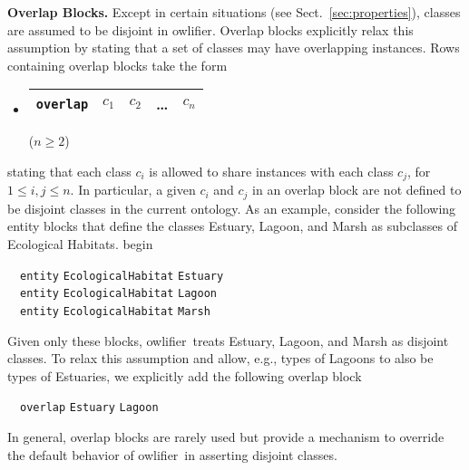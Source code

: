 \documentclass[preprint,number]{elsarticle}
\newcommand{\owlifier}{\textsf{owlifier}}
\newcommand{\myblock}[1]{\vspace{12pt}\noindent\textbf{#1}}
\newcommand{\secref}[1]{Sect.~\ref{#1}}
\begin{document}
\myblock{Overlap Blocks.} Except in certain situations (see
\secref{sec:properties}), classes are assumed to be disjoint in
\owlifier.  Overlap blocks explicitly relax this assumption by stating
that a set of classes may have overlapping instances. Rows containing
overlap blocks take the form
\begin{itemize}
\item[] 
  \begin{tabular}{|l|l|l|l|l|}\hline
    \texttt{overlap} & $c_1$ & $c_2$ & \dots & $c_n$ \\ \hline 
  \end{tabular} \hfill ($n \ge 2$)
\end{itemize}
stating that each class $c_i$ is allowed to share instances with each
class $c_j$, for $1 \le i,j \le n$. In particular, a given $c_i$ and
$c_j$ in an overlap block are not defined to be disjoint classes in
the current ontology. As an example, consider the following entity
blocks that define the classes Estuary, Lagoon, and Marsh as
subclasses of Ecological Habitats.
begin
\begin{tabbing}
  ~~\texttt{entity} \texttt{EcologicalHabitat} \texttt{Estuary} \\ 
  ~~\texttt{entity} \texttt{EcologicalHabitat} \texttt{Lagoon} \\ 
  ~~\texttt{entity} \texttt{EcologicalHabitat} \texttt{Marsh} \\ 
\end{tabbing}
Given only these blocks, \owlifier\ treats Estuary, Lagoon, and Marsh
as disjoint classes. To relax this assumption and allow, e.g., types
of Lagoons to also be types of Estuaries, we explicitly add the
following overlap block
\begin{tabbing}
  ~~\texttt{overlap} \texttt{Estuary} \texttt{Lagoon}
\end{tabbing}
In general, overlap blocks are rarely used but provide a mechanism to
override the default behavior of \owlifier\ in asserting disjoint
classes.
\end{document}
